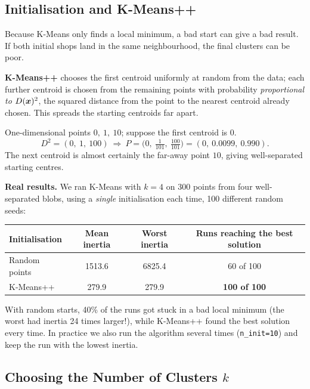 \subsection{Initialisation and K-Means++}

Because K-Means only finds a local minimum, a bad start can give a bad result. If both initial shops land in the same neighbourhood, the final clusters can be poor.

\begin{definition}
\textbf{K-Means++} chooses the first centroid uniformly at random from the data; each further centroid is chosen from the remaining points with probability \emph{proportional to $D(\boldsymbol{x})^2$}, the squared distance from the point to the nearest centroid already chosen. This spreads the starting centroids far apart.
\end{definition}

\begin{example}
One-dimensional points $0,\ 1,\ 10$; suppose the first centroid is $0$.
\[
  D^2=(0,\ 1,\ 100)\ \Rightarrow\ P=\Big(0,\ \tfrac1{101},\ \tfrac{100}{101}\Big)=(0,\ 0.0099,\ 0.990).
\]
The next centroid is almost certainly the far-away point $10$, giving well-separated starting centres.
\end{example}

\textbf{Real results.} We ran K-Means with $k=4$ on 300 points from four well-separated blobs, using a \emph{single} initialisation each time, 100 different random seeds:

\begin{center}
\begin{tabular}{@{}lccc@{}}
\toprule
\textbf{Initialisation} & \textbf{Mean inertia} & \textbf{Worst inertia} & \textbf{Runs reaching the best solution}\\
\midrule
Random points & 1513.6 & 6825.4 & 60 of 100\\
K-Means++ & 279.9 & 279.9 & \textbf{100 of 100}\\
\bottomrule
\end{tabular}
\end{center}

\noindent With random starts, 40\% of the runs got stuck in a bad local minimum (the worst had inertia 24 times larger!), while K-Means++ found the best solution every time. In practice we also run the algorithm several times (\texttt{n\_init=10}) and keep the run with the lowest inertia.

\subsection{Choosing the Number of Clusters $k$}

